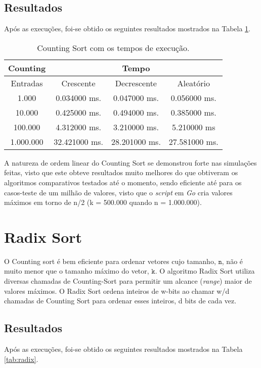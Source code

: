 \documentclass[
	12pt,				%
	openany,
	a4paper,			%
	english,			%
	french,				%
	spanish,			%
	brazil,				%
	]{abntex2}
\begin{document}
	\subsection{Resultados}
	Após as execuções, foi-se obtido os seguintes resultados mostrados na Tabela \ref{tab:counting}.
	
	\begin{table}[H]
\centering
\begin{tabular}{|c|c|c|c|}
\hline
Counting & \multicolumn{3}{c|}{Tempo} \\ \hline
Entradas & Crescente & Decrescente & Aleatório \\ \hline
1.000 & 0.034000 ms. & 0.047000 ms. & 0.056000 ms. \\ \hline
10.000 & 0.425000 ms. & 0.494000 ms. & 0.385000 ms. \\ \hline
100.000 & 4.312000 ms. & 3.210000 ms. & 5.210000 ms \\ \hline
1.000.000 & 32.421000 ms. & 28.201000 ms. & 27.581000 ms. \\ \hline
\end{tabular}
\caption{Counting Sort com os tempos de execução.}
\label{tab:counting}
\end{table}
	
	
	 A natureza de ordem linear do Counting Sort se demonstrou forte nas simulações feitas, visto que este obteve resultados muito melhores do que obtiveram os algoritmos comparativos testados até o momento, sendo eficiente até para os casos-teste de um milhão de valores, visto que o \textit{script} em \textit{Go} cria valores máximos em torno de n/2 (k = 500.000 quando n = 1.000.000).
	
	\section{Radix Sort}


    O Counting sort é bem eficiente para ordenar vetores cujo tamanho, $ \mathtt{n}$, não é muito menor que o tamanho máximo do vetor, $ \ensuremath{\mathtt{k}}$. O algoritmo Radix Sort utiliza diversas chamadas de Counting-Sort para permitir um alcance (\textit{range}) maior de valores máximos.
    O Radix Sort ordena inteiros de w-bits ao chamar w/d chamadas de Counting Sort para ordenar esses inteiros, d bits de cada vez.
    

    \subsection{Resultados}
    Após as execuções, foi-se obtido os seguintes resultados mostrados na Tabela \ref{tab:radix}.
    
\end{document}
